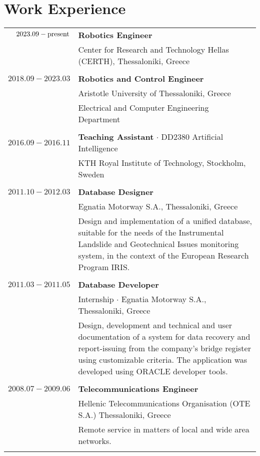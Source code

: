 \documentclass[a4paper,10pt,twoside]{article}
\begin{document}
\section{Work Experience}


\begin{tabular}{rp{11cm}}
$2023.09 - \hfill \textnormal{present} \hfill$ & \textbf{Robotics Engineer} \\
                                                           & Center for Research and Technology Hellas (CERTH), Thessaloniki, Greece\\
&\\
$2018.09 - 2023.03$ & \textbf{Robotics and Control Engineer} \\
                    & Aristotle University of Thessaloniki, Greece\\
                    & Electrical and Computer Engineering Department \\
&\\
$2016.09 - 2016.11$ & \textbf{Teaching Assistant} $\cdot$  DD2380 Artificial Intelligence \\
                    & KTH Royal Institute of Technology, Stockholm, Sweden\\
&\\

$2011.10 - 2012.03$ & \textbf{Database Designer} \\
                    & Egnatia Motorway S.A., Thessaloniki, Greece \\
& \small{Design and implementation of a unified database, suitable for the needs of the
Instrumental Landslide and Geotechnical Issues
monitoring system, in the context of the European Research Program IRIS.
}\\
\multicolumn{2}{c}{} \\


$2011.03 - 2011.05$ & \textbf{Database Developer} \\
                    & Internship $\cdot$ Egnatia Motorway S.A., Thessaloniki, Greece\\
& \small{Design, development and technical and user documentation of a system for data
recovery and report-issuing from the company's bridge register using
customizable criteria. The application was developed using ORACLE developer tools.
}\\
\multicolumn{2}{c}{} \\


$2008.07 - 2009.06$ & \textbf{Telecommunications Engineer} \\
  & Hellenic Telecommunications Organisation (OTE S.A.) Thessaloniki, Greece\\
& \small{Remote service in matters of local and wide area networks.
}\\
&\\
\end{tabular}
\end{document}
